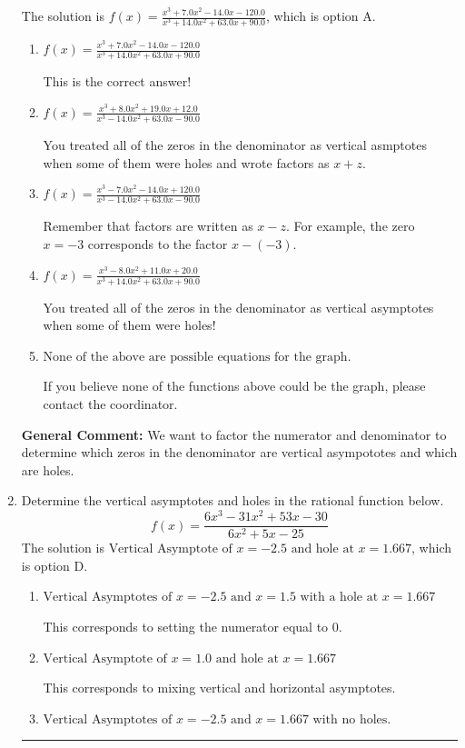 \documentclass{extbook}[14pt]
\newcommand{\litem}[1]{\item #1

\rule{\textwidth}{0.4pt}}
\begin{document}
\begin{enumerate}
{The solution is \( f(x)=\frac{x^{3} +7.0 x^{2} -14.0 x -120.0}{x^{3} +14.0 x^{2} +63.0 x + 90.0} \), which is option A.\begin{enumerate}[label=\Alph*.]
\item \( f(x)=\frac{x^{3} +7.0 x^{2} -14.0 x -120.0}{x^{3} +14.0 x^{2} +63.0 x + 90.0} \)

This is the correct answer!
\item \( f(x)=\frac{x^{3} +8.0 x^{2} +19.0 x + 12.0}{x^{3} -14.0 x^{2} +63.0 x -90.0} \)

You treated all of the zeros in the denominator as vertical asmptotes when some of them were holes and wrote factors as $x+z$.
\item \( f(x)=\frac{x^{3} -7.0 x^{2} -14.0 x + 120.0}{x^{3} -14.0 x^{2} +63.0 x -90.0} \)

Remember that factors are written as $x-z$. For example, the zero $x=-3$ corresponds to the factor $x-(-3)$.
\item \( f(x)=\frac{x^{3} -8.0 x^{2} +11.0 x + 20.0}{x^{3} +14.0 x^{2} +63.0 x + 90.0} \)

You treated all of the zeros in the denominator as vertical asymptotes when some of them were holes!
\item \( \text{None of the above are possible equations for the graph.} \)

If you believe none of the functions above could be the graph, please contact the coordinator.
\end{enumerate}

\textbf{General Comment:} We want to factor the numerator and denominator to determine which zeros in the denominator are vertical asympototes and which are holes.
}
\litem{
Determine the vertical asymptotes and holes in the rational function below.
\[ f(x) = \frac{6x^{3} -31 x^{2} +53 x -30}{6x^{2} +5 x -25} \]The solution is \( \text{Vertical Asymptote of } x = -2.5 \text{ and hole at } x = 1.667 \), which is option D.\begin{enumerate}[label=\Alph*.]
\item \( \text{Vertical Asymptotes of } x = -2.5 \text{ and } x = 1.5 \text{ with a hole at } x = 1.667 \)

This corresponds to setting the numerator equal to 0.
\item \( \text{Vertical Asymptote of } x = 1.0 \text{ and hole at } x = 1.667 \)

This corresponds to mixing vertical and horizontal asymptotes.
\item \( \text{Vertical Asymptotes of } x = -2.5 \text{ and } x = 1.667 \text{ with no holes.} \)


\end{enumerate}}
\end{enumerate}
\end{document}
